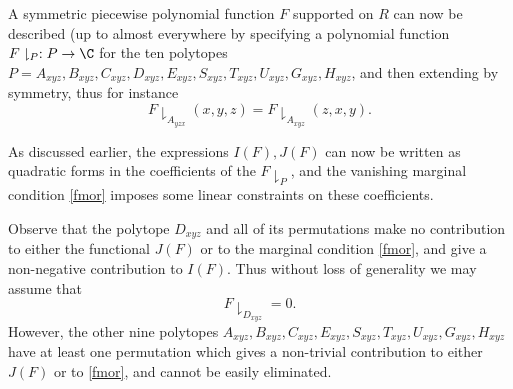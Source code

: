 
A symmetric piecewise polynomial function $F$ supported on $R$ can now be described (up to almost everywhere by specifying a polynomial function $F\downharpoonright_{P}: P \to \C$ for the ten polytopes $P = A_{xyz}, B_{xyz}, C_{xyz}, D_{xyz}, E_{xyz},  S_{xyz}, T_{xyz}, U_{xyz}, G_{xyz}, H_{xyz}$, and then extending by symmetry, thus for instance
$$ F\downharpoonright_{A_{yzx}}(x,y,z) = F\downharpoonright_{A_{xyz}}(z,x,y).$$

As discussed earlier, the expressions $I(F), J(F)$ can now be written as quadratic forms in the coefficients of the $F\downharpoonright_P$, and the vanishing marginal condition \eqref{fmor} imposes some linear constraints on these coefficients.

Observe that the polytope $D_{xyz}$ and all of its permutations make no contribution to either the functional $J(F)$ or to the marginal condition \eqref{fmor}, and give a non-negative contribution to $I(F)$.  Thus without loss of generality we may assume that
$$ F\downharpoonright_{D_{xyz}} = 0.$$
However, the other nine polytopes $A_{xyz}, B_{xyz}, C_{xyz}, E_{xyz}, S_{xyz}, T_{xyz}, U_{xyz}, G_{xyz}, H_{xyz}$ have at least one permutation which gives a non-trivial contribution to either $J(F)$ or to \eqref{fmor}, and cannot be easily eliminated.

